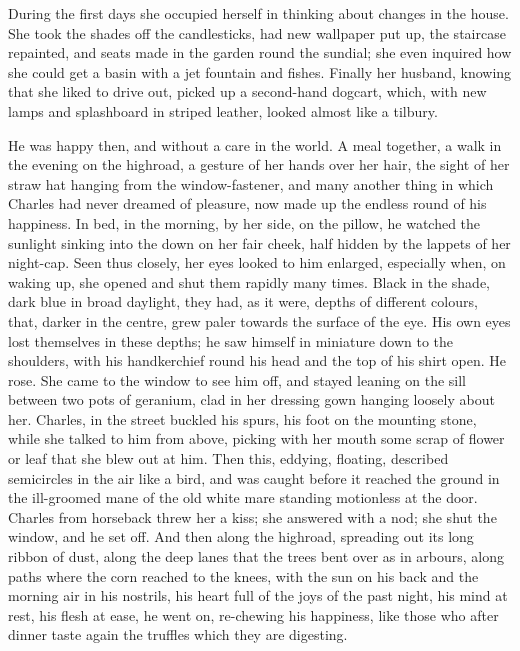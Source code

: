 \documentclass{tufte-book}
\begin{document}
During the first days she occupied herself in thinking about changes in
the house. She took the shades off the candlesticks, had new wallpaper
put up, the staircase repainted, and seats made in the garden round the
sundial; she even inquired how she could get a basin with a jet fountain
and fishes. Finally her husband, knowing that she liked to drive out,
picked up a second-hand dogcart, which, with new lamps and splashboard
in striped leather, looked almost like a tilbury.

He was happy then, and without a care in the world. A meal together,
a walk in the evening on the highroad, a gesture of her hands over her
hair, the sight of her straw hat hanging from the window-fastener, and
many another thing in which Charles had never dreamed of pleasure, now
made up the endless round of his happiness. In bed, in the morning, by
her side, on the pillow, he watched the sunlight sinking into the down
on her fair cheek, half hidden by the lappets of her night-cap. Seen
thus closely, her eyes looked to him enlarged, especially when, on
waking up, she opened and shut them rapidly many times. Black in the
shade, dark blue in broad daylight, they had, as it were, depths of
different colours, that, darker in the centre, grew paler towards the
surface of the eye. His own eyes lost themselves in these depths; he saw
himself in miniature down to the shoulders, with his handkerchief round
his head and the top of his shirt open. He rose. She came to the window
to see him off, and stayed leaning on the sill between two pots of
geranium, clad in her dressing gown hanging loosely about her. Charles,
in the street buckled his spurs, his foot on the mounting stone, while
she talked to him from above, picking with her mouth some scrap of
flower or leaf that she blew out at him. Then this, eddying, floating,
described semicircles in the air like a bird, and was caught before
it reached the ground in the ill-groomed mane of the old white mare
standing motionless at the door. Charles from horseback threw her a
kiss; she answered with a nod; she shut the window, and he set off. And
then along the highroad, spreading out its long ribbon of dust, along
the deep lanes that the trees bent over as in arbours, along paths where
the corn reached to the knees, with the sun on his back and the morning
air in his nostrils, his heart full of the joys of the past night, his
mind at rest, his flesh at ease, he went on, re-chewing his happiness,
like those who after dinner taste again the truffles which they are
digesting.
\end{document}
